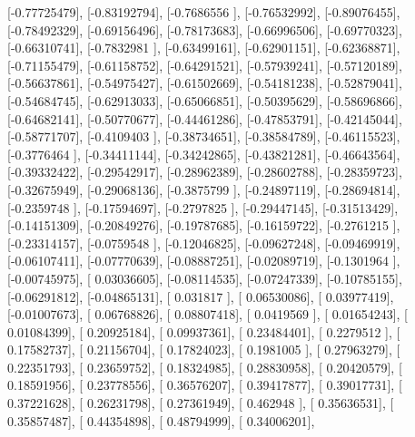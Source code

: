 \documentclass{article}
\begin{document}
       [-0.77725479],
       [-0.83192794],
       [-0.7686556 ],
       [-0.76532992],
       [-0.89076455],
       [-0.78492329],
       [-0.69156496],
       [-0.78173683],
       [-0.66996506],
       [-0.69770323],
       [-0.66310741],
       [-0.7832981 ],
       [-0.63499161],
       [-0.62901151],
       [-0.62368871],
       [-0.71155479],
       [-0.61158752],
       [-0.64291521],
       [-0.57939241],
       [-0.57120189],
       [-0.56637861],
       [-0.54975427],
       [-0.61502669],
       [-0.54181238],
       [-0.52879041],
       [-0.54684745],
       [-0.62913033],
       [-0.65066851],
       [-0.50395629],
       [-0.58696866],
       [-0.64682141],
       [-0.50770677],
       [-0.44461286],
       [-0.47853791],
       [-0.42145044],
       [-0.58771707],
       [-0.4109403 ],
       [-0.38734651],
       [-0.38584789],
       [-0.46115523],
       [-0.3776464 ],
       [-0.34411144],
       [-0.34242865],
       [-0.43821281],
       [-0.46643564],
       [-0.39332422],
       [-0.29542917],
       [-0.28962389],
       [-0.28602788],
       [-0.28359723],
       [-0.32675949],
       [-0.29068136],
       [-0.3875799 ],
       [-0.24897119],
       [-0.28694814],
       [-0.2359748 ],
       [-0.17594697],
       [-0.2797825 ],
       [-0.29447145],
       [-0.31513429],
       [-0.14151309],
       [-0.20849276],
       [-0.19787685],
       [-0.16159722],
       [-0.2761215 ],
       [-0.23314157],
       [-0.0759548 ],
       [-0.12046825],
       [-0.09627248],
       [-0.09469919],
       [-0.06107411],
       [-0.07770639],
       [-0.08887251],
       [-0.02089719],
       [-0.1301964 ],
       [-0.00745975],
       [ 0.03036605],
       [-0.08114535],
       [-0.07247339],
       [-0.10785155],
       [-0.06291812],
       [-0.04865131],
       [ 0.031817  ],
       [ 0.06530086],
       [ 0.03977419],
       [-0.01007673],
       [ 0.06768826],
       [ 0.08807418],
       [ 0.0419569 ],
       [ 0.01654243],
       [ 0.01084399],
       [ 0.20925184],
       [ 0.09937361],
       [ 0.23484401],
       [ 0.2279512 ],
       [ 0.17582737],
       [ 0.21156704],
       [ 0.17824023],
       [ 0.1981005 ],
       [ 0.27963279],
       [ 0.22351793],
       [ 0.23659752],
       [ 0.18324985],
       [ 0.28830958],
       [ 0.20420579],
       [ 0.18591956],
       [ 0.23778556],
       [ 0.36576207],
       [ 0.39417877],
       [ 0.39017731],
       [ 0.37221628],
       [ 0.26231798],
       [ 0.27361949],
       [ 0.462948  ],
       [ 0.35636531],
       [ 0.35857487],
       [ 0.44354898],
       [ 0.48794999],
       [ 0.34006201],
\end{document}
